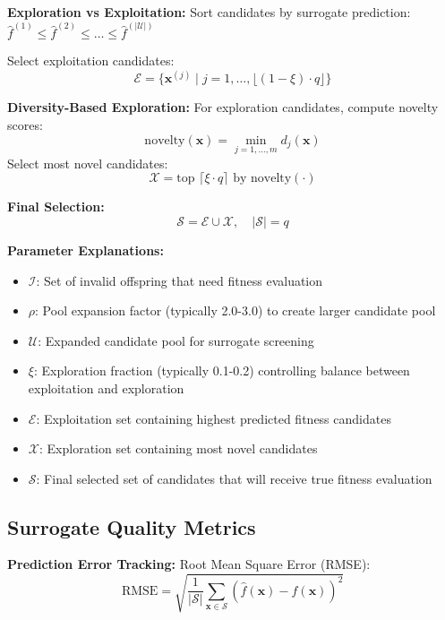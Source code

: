\documentclass[12pt,a4paper]{article}
\begin{document}
\textbf{Exploration vs Exploitation:}
Sort candidates by surrogate prediction: $\hat{f}^{(1)} \leq \hat{f}^{(2)} \leq \dots \leq \hat{f}^{(|\mathcal{U}|)}$

Select exploitation candidates:
\begin{equation}
\mathcal{E} = \{\bm{x}^{(j)} \mid j = 1, \dots, \lfloor (1-\xi) \cdot q \rfloor\} \label{eq:exploitation_selection}
\end{equation}

\textbf{Diversity-Based Exploration:}
For exploration candidates, compute novelty scores:
\begin{equation}
\text{novelty}(\bm{x}) = \min_{j=1,\dots,m} d_j(\bm{x}) \label{eq:novelty_score}
\end{equation}
Select most novel candidates:
\begin{equation}
\mathcal{X} = \text{top } \lceil \xi \cdot q \rceil \text{ by novelty}(\cdot) \label{eq:exploration_selection}
\end{equation}

\textbf{Final Selection:}
\begin{equation}
\mathcal{S} = \mathcal{E} \cup \mathcal{X}, \quad |\mathcal{S}| = q \label{eq:final_surrogate_selection}
\end{equation}

\textbf{Parameter Explanations:}
\begin{itemize}
\item $\mathcal{I}$: Set of invalid offspring that need fitness evaluation
\item $\rho$: Pool expansion factor (typically 2.0-3.0) to create larger candidate pool
\item $\mathcal{U}$: Expanded candidate pool for surrogate screening
\item $\xi$: Exploration fraction (typically 0.1-0.2) controlling balance between exploitation and exploration
\item $\mathcal{E}$: Exploitation set containing highest predicted fitness candidates
\item $\mathcal{X}$: Exploration set containing most novel candidates
\item $\mathcal{S}$: Final selected set of candidates that will receive true fitness evaluation
\end{itemize}

\subsection{Surrogate Quality Metrics}
\textbf{Prediction Error Tracking:}
Root Mean Square Error (RMSE):
\begin{equation}
\text{RMSE} = \sqrt{\frac{1}{|\mathcal{S}|} \sum_{\bm{x} \in \mathcal{S}} (\hat{f}(\bm{x}) - f(\bm{x}))^2} \label{eq:surrogate_rmse}
\end{equation}
\end{document}
